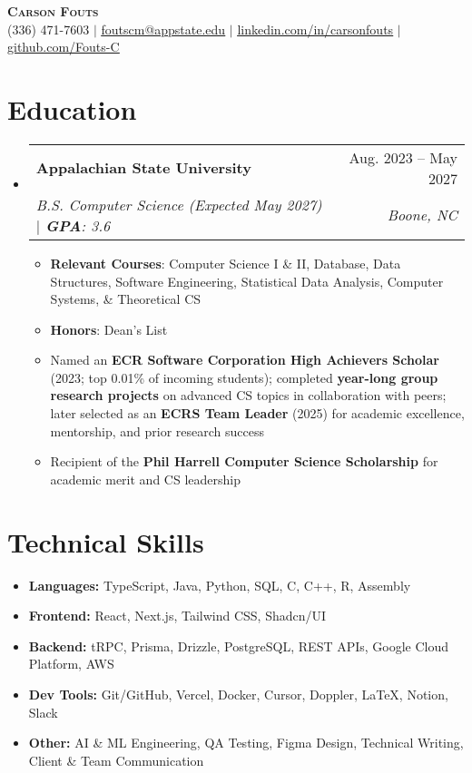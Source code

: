 \documentclass[letterpaper,11pt]{article}
\makeatletter
\newcommand{\resumeItem}[1]{
  \item\small{
    {#1 \vspace{-2pt}}
  }
}
\newcommand{\resumeSubheading}[4]{
  \vspace{-2pt}\item
    \begin{tabular*}{0.97\textwidth}[t]{l@{\extracolsep{\fill}}r}
      \textbf{#1} & #2 \\
      \textit{\small#3} & \textit{\small #4} \\
    \end{tabular*}\vspace{-7pt}
}
\newcommand{\resumeSubHeadingListStart}{\begin{itemize}[leftmargin=0.15in, label={}]}
\newcommand{\resumeSubHeadingListEnd}{\end{itemize}}
\newcommand{\resumeItemListStart}{\begin{itemize}}
\newcommand{\resumeItemListEnd}{\end{itemize}\vspace{-5pt}}
\makeatother
\begin{document}
\begin{center}
    \textbf{\Huge \scshape Carson Fouts} \\ \vspace{1pt}
    \small (336) 471-7603 $|$ \href{mailto:foutscm@appstate.edu}{\underline{foutscm@appstate.edu}} $|$ 
    \href{https://linkedin.com/in/carsonfouts}{\underline{linkedin.com/in/carsonfouts}}
    $|$ 
    \href{https://github.com/Fouts-C}{\underline{github.com/Fouts-C}}
\end{center}

\section{Education}
  \resumeSubHeadingListStart
    \resumeSubheading
      {Appalachian State University}{Aug. 2023 -- May 2027}
      {B.S. Computer Science (Expected May 2027) $|$ \textbf{GPA}: 3.6}
      {Boone, NC}
      \resumeItemListStart
        \resumeItem{\textbf{Relevant Courses}: Computer Science I \& II, Database, Data Structures, Software Engineering, Statistical Data Analysis, Computer Systems, \& Theoretical CS}
        \resumeItem{\textbf{Honors}: Dean's List}
        \resumeItem{Named an \textbf{ECR Software Corporation High Achievers Scholar} (2023; top 0.01\% of incoming students); completed \textbf{year-long group research projects} on advanced CS topics in collaboration with peers; later selected as an \textbf{ECRS Team Leader} (2025) for academic excellence, mentorship, and prior research success}
        \resumeItem{Recipient of the \textbf{Phil Harrell Computer Science Scholarship} for academic merit and CS leadership}
      \resumeItemListEnd
  \resumeSubHeadingListEnd

\section{Technical Skills}
\begin{itemize}[leftmargin=0.15in, label={}]
  \item[] \textbf{Languages:} TypeScript, Java, Python, SQL, C, C++, R, Assembly
  \item[] \textbf{Frontend:} React, Next.js, Tailwind CSS, Shadcn/UI
  \item[] \textbf{Backend:} tRPC, Prisma, Drizzle, PostgreSQL, REST APIs, Google Cloud Platform, AWS
  \item[] \textbf{Dev Tools:} Git/GitHub, Vercel, Docker, Cursor, Doppler, LaTeX, Notion, Slack
  \item[] \textbf{Other:} AI \& ML Engineering, QA Testing, Figma Design, Technical Writing, Client \& Team Communication
\end{itemize}
\end{document}
